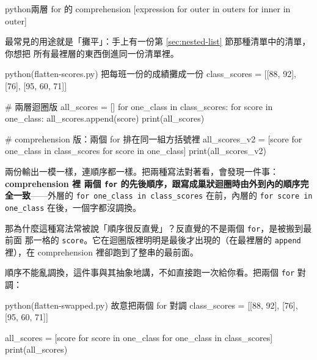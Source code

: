 \begin{code}{python}{兩層 for 的 comprehension}
[expression for outer in outers for inner in outer]
\end{code}

最常見的用途就是「攤平」：手上有一份第 \ref{sec:nested-list} 節那種清單中的清單，你想把
所有最裡層的東西倒進同一份清單裡。

\begin{example}{python}{(flatten-scores.py) 把每班一份的成績攤成一份}
class_scores = [[88, 92], [76], [95, 60, 71]]

# 兩層迴圈版
all_scores = []
for one_class in class_scores:
    for score in one_class:
        all_scores.append(score)
print(all_scores)

# comprehension 版：兩個 for 排在同一組方括號裡
all_scores_v2 = [score for one_class in class_scores for score in one_class]
print(all_scores_v2)
\end{example}

\iosample{}{[88, 92, 76, 95, 60, 71] \\{} [88, 92, 76, 95, 60, 71] \\}

兩份輸出一模一樣，連順序都一樣。把兩種寫法對著看，會發現一件事：\textbf{comprehension 裡
兩個 \texttt{for} 的先後順序，跟寫成巢狀迴圈時由外到內的順序完全一致}——外層的
\texttt{for one\_class in class\_scores} 在前，內層的 \texttt{for score in one\_class}
在後，一個字都沒調換。

那為什麼這種寫法常被說「順序很反直覺」？反直覺的不是兩個 \texttt{for}，是被搬到最前面
那一格的 \texttt{score}。它在迴圈版裡明明是最後才出現的（在最裡層的 \texttt{append}
裡），在 comprehension 裡卻跑到了整串的最前面。


順序不能亂調換，這件事與其抽象地講，不如直接跑一次給你看。把兩個 \texttt{for} 對調：

\begin{example}{python}{(flatten-swapped.py) 故意把兩個 for 對調}
class_scores = [[88, 92], [76], [95, 60, 71]]

all_scores = [score for score in one_class for one_class in class_scores]
print(all_scores)
\end{example}

